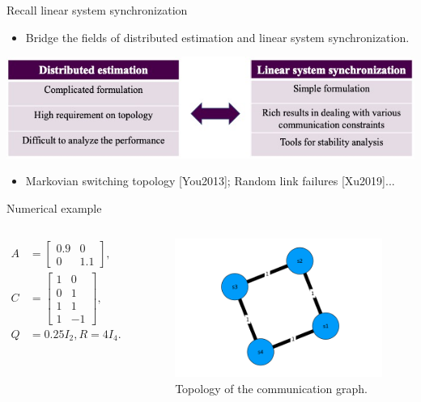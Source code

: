 \documentclass[10pt]{beamer}
\DeclareMathOperator{\1}{\textbf{1}}
\begin{document}
	  \begin{frame}{Recall linear system synchronization}
	    \begin{itemize}
	      \item Bridge the fields of distributed estimation and linear system synchronization.
	    \end{itemize}
	    \includegraphics[width=1\textwidth]{pic/bridge}
	    \begin{itemize}
	      \item Markovian switching topology [You2013]; Random link failures [Xu2019]...
	    \end{itemize}
	  \end{frame}

	  \begin{frame}{Numerical example}
	    \begin{columns}[c]
	      \column{5cm}
	      \begin{align*}
		A&=\begin{bmatrix}
		  0.9 & 0\\
		  0 & 1.1
		\end{bmatrix},\\
		  C&=\begin{bmatrix}
		    1 & 0\\
		    0 & 1\\
		    1 & 1\\
		    1 & -1
		  \end{bmatrix},\\
		    Q&=0.25I_2, R=4I_4.
		  \end{align*}
		  \column{7cm}
		  \begin{figure}
		    \centering
		    \includegraphics[width=1\textwidth]{pic/topology.png}
		    \caption{Topology of the communication graph.}
		  \end{figure}
		\end{columns}
	      \end{frame}
\end{document}
